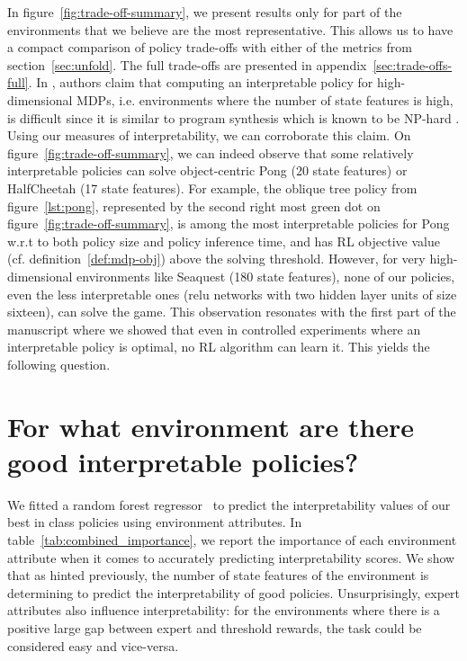 In figure~\ref{fig:trade-off-summary}, we present results only for part of the environments that we believe are the most representative.
This allows us to have a compact comparison of policy trade-offs with either of the metrics from section~\ref{sec:unfold}.
The full trade-offs are presented in appendix~\ref{sec:trade-offs-full}.
In \cite{glanois-survey}, authors claim that computing an interpretable policy for high-dimensional MDPs, i.e. environments where the number of state features is high, is difficult since it is similar to program synthesis which is known to be NP-hard \cite{program-synth}.
Using our measures of interpretability, we can corroborate this claim.
On figure~\ref{fig:trade-off-summary}, we can indeed observe that some relatively interpretable policies can solve object-centric Pong (20 state features) or HalfCheetah (17 state features). 
For example, the oblique tree policy from figure~\ref{lst:pong}, represented by the second right most green dot on figure~\ref{fig:trade-off-summary}, is among the most interpretable policies for Pong w.r.t to both policy size and policy inference time, and has RL objective value (cf. definition~\ref{def:mdp-obj}) above the solving threshold.  
However, for very high-dimensional environments like Seaquest (180 state features), none of our policies, even the less interpretable ones (relu networks with two hidden layer units of size sixteen), can solve the game.
This observation resonates with the first part of the manuscript where we showed that even in controlled experiments where an interpretable policy is optimal, no RL algorithm can learn it.
This yields the following question.

\section{For what environment are there good interpretable policies?}
We fitted a random forest regressor~\cite{random} to predict the interpretability values of our best in class policies using environment attributes. 
In table~\ref{tab:combined_importance}, we report the importance of each environment attribute when it comes to accurately predicting interpretability scores.
We show that as hinted previously, the number of state features of the environment is determining to predict the interpretability of good policies.
Unsurprisingly, expert attributes also influence interpretability: for the environments where there is a positive large gap between expert and threshold rewards, the task could be considered easy and vice-versa.

